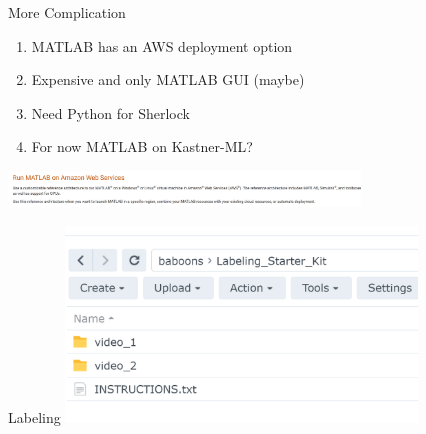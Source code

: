 \begin{frame}{More Complication}
    \begin{enumerate}
        \item MATLAB has an AWS deployment option
        \item Expensive and only MATLAB GUI (maybe)
        \item Need Python for Sherlock
        \item For now MATLAB on Kastner-ML?
    \end{enumerate}
    \centering
    \includegraphics[height=0.7\textheight, width=0.7\textwidth, keepaspectratio]{images/bom/matlab.png}
\end{frame}

\begin{frame}{Labeling}
    \centering
    \includegraphics[height=0.7\textheight, width=0.7\textwidth, keepaspectratio]{images/bom/labeling.png}
\end{frame}